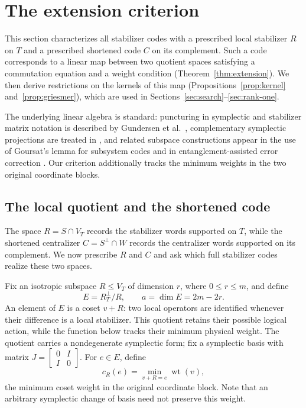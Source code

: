 \documentclass[11pt]{article}
\theoremstyle{definition}
\theoremstyle{remark}
\newcommand{\wt}{\operatorname{wt}}
\newcommand{\cost}{c_R}
\begin{document}
\section{The extension criterion}\label{sec:extension}

This section characterizes all stabilizer codes with a prescribed local
stabilizer \(R\) on \(T\) and a prescribed shortened code \(C\) on its
complement. Such a code corresponds to a linear map between two quotient
spaces satisfying a commutation equation and a weight condition
(Theorem~\ref{thm:extension}). We then derive restrictions on the
kernels of this map (Propositions~\ref{prop:kernel}
and~\ref{prop:griesmer}), which are used in
Sections~\ref{sec:search}--\ref{sec:rank-one}.

The underlying linear algebra is standard: puncturing in symplectic and
stabilizer matrix notation is described by Gundersen et al.\
\cite{puncturing}, complementary symplectic projections are treated in
\cite{anticodes}, and related subspace constructions appear in the use
of Goursat's lemma for subsystem codes \cite{goursat} and in
entanglement-assisted error correction \cite{catalytic}. Our criterion
additionally tracks the minimum weights in the two original coordinate
blocks.

\subsection{The local quotient and the shortened code}

The space \(R=S\cap V_T\) records the stabilizer words supported on
\(T\), while the shortened centralizer \(C=S^\perp\cap W\) records the
centralizer words supported on its complement. We now prescribe \(R\)
and \(C\) and ask which full stabilizer codes realize these two spaces.

Fix an isotropic subspace \(R\leq V_T\) of dimension \(r\), where
\(0\leq r\leq m\), and define
\[
 E=R_T^\perp/R,\qquad a=\dim E=2m-2r.
\]
An element of \(E\) is a coset \(v+R\): two local operators are
identified whenever their difference is a local stabilizer. This
quotient retains their possible logical action, while the function below
tracks their minimum physical weight. The quotient carries a
nondegenerate symplectic form; fix a symplectic basis with matrix
\(J=\left[\begin{smallmatrix}0&I\\I&0\end{smallmatrix}\right]\). For
\(e\in E\), define
\[
 \cost(e)=\min_{v+R=e}\wt(v),
\]
the minimum coset weight in the original coordinate block. Note that an
arbitrary symplectic change of basis need not preserve this weight.
\end{document}
